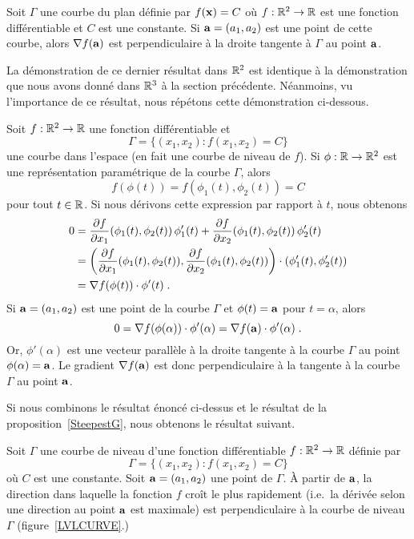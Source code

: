 {\begin{focus}{\prp}
Soit $\Gamma$ une courbe du plan définie par $f(\mathbf{x})=C$ où
$f:\mathbb{R}^2\rightarrow \mathbb{R}$ est une fonction différentiable et $C$ est une
constante.  Si $\mathbf{a} = (a_1,a_2)$ est une point de cette courbe,
alors $\nabla f(\mathbf{a})$ est perpendiculaire à la droite tangente à
$\Gamma$ au point $\mathbf{a}$.
\end{focus}

La démonstration de ce dernier résultat dans $\mathbb{R}^2$ est identique à la
démonstration que nous avons donné dans $\mathbb{R}^3$ à la section précédente.
Néanmoins, vu l'importance de ce résultat, nous répétons cette démonstration
ci-dessous.

Soit $f:\mathbb{R}^2\rightarrow \mathbb{R}$ une fonction différentiable et
\[
\Gamma = \{ (x_1,x_2) : f(x_1,x_2)= C \}
\]
une courbe dans l'espace (en fait une courbe de niveau de $f$).  Si
$\phi:\mathbb{R}\rightarrow \mathbb{R}^2$ est une représentation paramétrique de la
courbe $\Gamma$, alors
\[
f(\phi(t)) = f(\phi_1(t) , \phi_2(t)) = C
\]
pour tout $t\in\mathbb{R}$.  Si nous dérivons cette expression par rapport à
$t$, nous obtenons
\begin{align*}
0 &= \frac{\partial f}{\partial x_1}(\phi_1(t),\phi_2(t))\, \phi_1'(t)
+ \frac{\partial f}{\partial x_2}(\phi_1(t),\phi_2(t))\, \phi_2'(t) \\
&= \left(\frac{\partial f}{\partial x_1}(\phi_1(t),\phi_2(t)),
\frac{\partial f}{\partial x_2}(\phi_1(t),\phi_2(t))\right) \cdot (\phi_1'(t),\phi_2'(t)) \\
&= \nabla f(\phi(t))\cdot \phi'(t) \; .
\end{align*}
Si $\mathbf{a} = (a_1,a_2)$ est une point de la courbe $\Gamma$ et
$\phi(t) = \mathbf{a}$ pour  $t=\alpha$, alors
\[
0 = \nabla f(\phi(\alpha))\cdot \phi'(\alpha)
= \nabla f(\mathbf{a})\cdot \phi'(\alpha) \; .
\]
Or, $\phi'(\alpha)$ est une vecteur parallèle à la droite tangente à la
courbe $\Gamma$ au point $\phi(\alpha)=\mathbf{a}$.  Le gradient
$\nabla f(\mathbf{a})$ est donc perpendiculaire à la tangente à la courbe
$\Gamma$ au point $\mathbf{a}$.

Si nous combinons le résultat énoncé ci-dessus et le résultat de la
proposition~\ref{SteepestG}, nous obtenons le résultat suivant.

\begin{focus}{\prp}
Soit $\Gamma$ une courbe de niveau d'une fonction différentiable
$f:\mathbb{R}^2\rightarrow \mathbb{R}$ définie par
\[
\Gamma = \{ (x_1,x_2) : f(x_1,x_2) = C \}
\]
où $C$ est une constante.  Soit $\mathbf{a}=(a_1,a_2)$ une point de
$\Gamma$.  À partir de $\mathbf{a}$, la direction dans laquelle la
fonction $f$ croît le plus rapidement (i.e.\ la dérivée selon une
direction au point $\mathbf{a}$ est maximale) est perpendiculaire à la
courbe de niveau $\Gamma$ (figure~\ref{LVLCURVE}.)
\end{focus}

}
